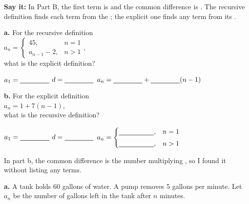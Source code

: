 \vspace{4pt}
\textbf{Say it:} In Part B, the first term is \blank[1.5cm] and the common difference is \blank[1.5cm]. The recursive definition finds each term from the \blank[2.2cm]; the explicit one finds any term from its \blank[2.2cm].

\vspace{6pt}
\begin{minipage}[t]{0.48\textwidth}
\vspace{0pt}
\textbf{a.} For the recursive definition\\[3pt]
$a_n=\begin{cases}45, & n=1\\ a_{n-1}-2, & n>1\end{cases}$,\\[3pt]
what is the explicit definition?

\vspace{4pt}
$a_1=\blank[1.5cm]$ \qquad $d=\blank[1.5cm]$
\lines[3]
$a_n=\blank[1.5cm]+\blank[1.5cm](n-1)$
\end{minipage}\hfill
\begin{minipage}[t]{0.48\textwidth}
\vspace{0pt}
\textbf{b.} For the explicit definition\\[3pt]
$a_n=1+7(n-1)$,\\[3pt]
what is the recursive definition?

\vspace{4pt}
$a_1=\blank[1.5cm]$ \qquad $d=\blank[1.5cm]$
\lines[3]
$a_n=\begin{cases}\blank[1.8cm], & n=1\\[3pt] \blank[1.8cm], & n>1\end{cases}$
\end{minipage}

\vspace{4pt}
In part b, the common difference is the number multiplying \blank[2.4cm], so I found it without listing any terms.

\vspace{10pt}

\textbf{a.} A tank holds 60 gallons of water. A pump removes 5 gallons per minute. Let $a_n$ be the number of gallons left in the tank after $n$ minutes.

